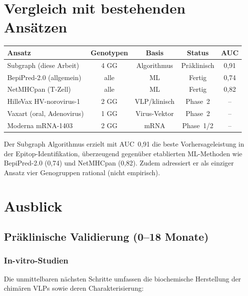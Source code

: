 ﻿\documentclass[a4paper,12pt]{article}
\theoremstyle{plain}
\theoremstyle{definition}
\theoremstyle{remark}
\begin{document}
\section{Vergleich mit bestehenden Ansätzen}

\begin{center}
\begin{tabular}{lcccc}
\toprule
\textbf{Ansatz} & \textbf{Genotypen} & \textbf{Basis} & \textbf{Status} & \textbf{AUC} \\
\midrule
Subgraph (diese Arbeit) & 4 GG & Algorithmus & Präklinisch & 0{,}91 \\
BepiPred-2.0 (allgemein) & alle & ML & Fertig & 0{,}74 \\
NetMHCpan (T-Zell) & alle & ML & Fertig & 0{,}82 \\
HilleVax HV-norovirus-1 & 2 GG & VLP/klinisch & Phase~2 & -- \\
Vaxart (oral, Adenovirus) & 1 GG & Virus-Vektor & Phase~2 & -- \\
Moderna mRNA-1403 & 2 GG & mRNA & Phase~1/2 & -- \\
\bottomrule
\end{tabular}
\end{center}

Der Subgraph Algorithmus erzielt mit AUC~0{,}91 die beste Vorhersageleistung in
der Epitop-Identifikation, überzeugend gegenüber etablierten ML-Methoden wie
BepiPred-2.0 (0{,}74) und NetMHCpan (0{,}82). Zudem adressiert er als einziger Ansatz
vier Genogruppen rational (nicht empirisch).

\section{Ausblick}

\subsection{Präklinische Validierung (0--18 Monate)}

\subsubsection{In-vitro-Studien}

Die unmittelbaren nächsten Schritte umfassen die biochemische Herstellung der chimären
VLPs sowie deren Charakterisierung:
\end{document}
